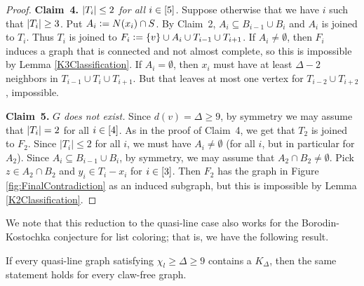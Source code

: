 \begin{proof}
\textbf{Claim~4.} \textit{$\left|T_i\right| \leq 2$ for all $i \in \left[5\right]$.}
Suppose otherwise that we have $i$ such that $\left|T_i\right| \geq 3$.  Put $A_i
\mathrel{\mathop:}= N(x_i) \cap S$. By Claim~2, $A_i \subseteq
B_{i-1} \cup B_i$ and $A_i$ is joined to $T_i$.  Thus $T_i$ is joined to $F_i
\mathrel{\mathop:}= \left\{ v \right\} \cup A_i \cup T_{i-1} \cup T_{i+1}$.  If $A_i\ne\emptyset$,
then $F_i$ induces a graph that is connected and not almost complete, so this
is impossible by Lemma \ref{K3Classification}.   If $A_i = \emptyset$, then
$x_i$ must have at least $\Delta - 2$ neighbors in $T_{i-1} \cup T_i \cup
T_{i+1}$.  But that leaves at most one vertex for $T_{i-2} \cup T_{i+2}$,
impossible.

\textbf{Claim~5.} \textit{$G$ does not exist.}
Since $d(v) = \Delta \geq 9$, by symmetry we may assume that $\left|T_i\right| = 2$
for all $i \in \left[4\right]$.  As in the proof of Claim~4, we get that $T_2$ is joined to $F_2$. Since $|T_i|\le 2$ for all $i$, we must have $A_i\ne \emptyset$ (for all $i$,
but in particular for $A_2$). Since $A_i\subseteq B_{i-1}\cup B_i$, by symmetry,
we may assume that $A_2 \cap B_2 \neq \emptyset$. Pick $z \in A_2 \cap B_2$ and $y_i \in T_i - x_i$ for $i \in \left[3\right]$. 
Then $F_2$ has the graph in Figure \ref{fig:FinalContradiction} as an induced subgraph, but this is impossible by Lemma \ref{K2Classification}.
\end{proof}
  


We note that this reduction to the quasi-line case also works for the
Borodin-Kostochka conjecture for list coloring; that is, we have the following
result.

\begin{thm}\label{ClawFreeLiftForLists}
If every quasi-line graph satisfying $\chi_l \geq \Delta \geq 9$ contains a
$K_\Delta$, then the same statement holds for every claw-free graph.
\end{thm}


